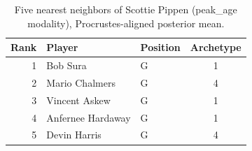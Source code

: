 \begin{table}[htbp]
  \centering\small
  \begin{tabular}{rllc}
    \toprule
    Rank & Player & Position & Archetype \\
    \midrule
    1 & Bob Sura & G & 1 \\
    2 & Mario Chalmers & G & 4 \\
    3 & Vincent Askew & G & 1 \\
    4 & Anfernee Hardaway & G & 1 \\
    5 & Devin Harris & G & 4 \\
    \bottomrule
  \end{tabular}
  \caption{Five nearest neighbors of Scottie Pippen (peak_age modality), Procrustes-aligned posterior mean.}
  \label{tab:Scottie_Pippen_neighbors_peak_age}
\end{table}

